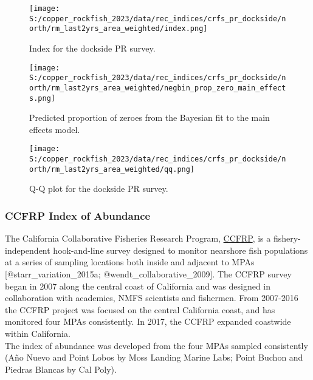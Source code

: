 \documentclass[11pt,
  letterpaper,
]{article}
\begin{document}
\begin{figure}
{\centering
\texttt{[image: S:/copper\_rockfish\_2023/data/rec\_indices/crfs\_pr\_dockside/north/rm\_last2yrs\_area\_weighted/index.png]}
}
\caption{Index for the dockside PR survey.\label{fig:pr-index}}
\end{figure}

\begin{figure}
{\centering
\texttt{[image: S:/copper\_rockfish\_2023/data/rec\_indices/crfs\_pr\_dockside/north/rm\_last2yrs\_area\_weighted/negbin\_prop\_zero\_main\_effects.png]}
}
\caption{Predicted proportion of zeroes from the Bayesian fit to the main effects model.\label{fig:pr-prop-zero}}
\end{figure}

\begin{figure}
{\centering
\texttt{[image: S:/copper\_rockfish\_2023/data/rec\_indices/crfs\_pr\_dockside/north/rm\_last2yrs\_area\_weighted/qq.png]}
}
\caption{Q-Q plot for the dockside PR survey.\label{fig:pr-qq}}
\end{figure}

\subsubsection{CCFRP Index of Abundance}\label{ccfrp-index}

The California Collaborative Fisheries Research Program, \href{https://www.mlml.calstate.edu/ccfrp/}{CCFRP}, is a fishery-independent hook-and-line survey designed to monitor nearshore fish populations at a series of sampling locations both inside and adjacent to MPAs {[}@starr\_variation\_2015a; @wendt\_collaborative\_2009{]}. The CCFRP survey began in 2007 along the central coast of California and was designed in collaboration with academics, NMFS scientists and fishermen. From 2007-2016 the CCFRP project was focused on the central California coast, and has monitored four MPAs consistently. In 2017, the CCFRP expanded coastwide within California.\\
The index of abundance was developed from the four MPAs sampled consistently (Año Nuevo and Point Lobos by Moss Landing Marine Labs; Point Buchon and Piedras Blancas by Cal Poly).
\end{document}
